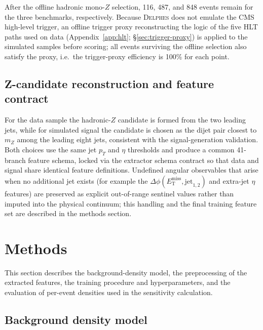 \documentclass[11pt,a4paper,twocolumn]{article}
\newcommand{\MET}{\ensuremath{E_{\mathrm{T}}^{\mathrm{miss}}}}
\begin{document}
After the offline hadronic mono-$Z$ selection, 116, 487, and 848 events
remain for the three benchmarks, respectively. Because \textsc{Delphes} does
not emulate the CMS high-level trigger, an offline trigger proxy
reconstructing the logic of the five HLT paths used on data
(Appendix~\ref{app:hlt}; \S\ref{sec:trigger-proxy}) is applied to the
simulated samples before scoring; all events surviving the offline selection
also satisfy the proxy, i.e.\ the trigger-proxy efficiency is 100\% for each
point.

\subsection{Z-candidate reconstruction and feature contract}

For the data sample the hadronic-$Z$ candidate is formed from the two leading
jets, while for simulated signal the candidate is chosen as the dijet pair
closest to $m_Z$ among the leading eight jets, consistent with the
signal-generation validation. Both choices use the same jet $p_T$ and
$\eta$ thresholds and produce a common 41-branch feature schema, locked via
the extractor schema contract so that data and signal share identical
feature definitions. Undefined angular observables that arise when no
additional jet exists (for example the
$\Delta\phi(\MET,\mathrm{jet}_{1,2})$ and extra-jet $\eta$ features) are
preserved as explicit out-of-range sentinel values rather than imputed into
the physical continuum; this handling and the final training feature set are
described in the methods section.

\section{Methods}

This section describes the background-density model, the preprocessing of
the extracted features, the training procedure and hyperparameters, and the
evaluation of per-event densities used in the sensitivity calculation.

\subsection{Background density model}
\end{document}

